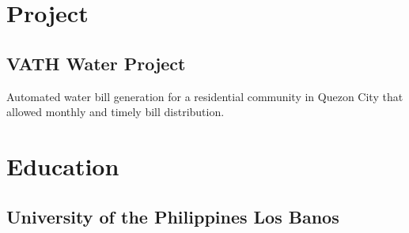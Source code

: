 \documentclass[top=0.5in]{deedy-resume-openfont}
\begin{document}
\begin{minipage}[t]{0.66\textwidth}

\section{Project}

\subsection{VATH Water Project}
Automated water bill generation for a residential community in Quezon City that allowed monthly and timely bill distribution.


\section{Education}

\subsection{University of the Philippines Los Banos}
\sectionsep




\end{minipage}
\end{document}

